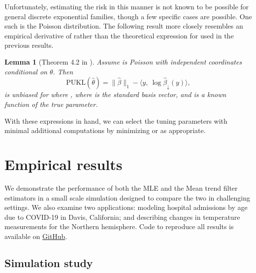 \documentclass[ejs,noshowframe]{imsart}
\theoremstyle{plain}
\newtheorem{lemma}[theorem]{Lemma}
\theoremstyle{definition}
\newcommand{\snorm}[1]{\lVert #1 \rVert}
\newcommand{\E}{E}
\renewcommand{\hat}{\widehat}
\begin{document}
Unfortunately, estimating the risk in this manner is not known to be possible
for general discrete exponential 
families, though a few specific cases are possible. One such is the Poisson distribution. The
following result more closely resembles an empirical derivative of 
\smash{$\hat\beta$}
rather than the theoretical expression for \smash{$J\hat\beta(y)$} used in the 
previous
results. 

\begin{lemma}[Theorem 4.2 in \citealt{Deledalle2017}]
	Assume  is Poisson with independent coordinates conditional on
  $\theta$. Then 
	\begin{equation}
		\mathrm{PUKL}(\hat\theta) = \snorm{\hat\beta}_1 - \langle  y,\
		\log \hat\beta_{\downarrow}(y) \rangle, 
	\end{equation}
	is unbiased for \smash{$\E[\mathrm{KL}(\theta^*\ \Vert\ \hat\theta(Y))] -
    z(\theta^*)$}  
	where
	\smash{$[\hat\beta_{\downarrow}(y)]_i = [\hat\beta(y-e_i)]_i$}, where 
	\smash{$e_i$} 
	is the
	 standard basis vector, and  is a known
	function of the true parameter.
\end{lemma}

With these expressions in hand, we can select the tuning parameters 
\smash{$\lambda_1,\
\lambda_2$} with minimal additional computations by minimizing
\smash{$\mathrm{SUKL}(\hat\theta)$} or 
\smash{$\mathrm{PUKL}(\hat\theta)$} as appropriate.







\section{Empirical results}
\label{sec:experiments}

 We demonstrate the performance of both the MLE and the Mean trend
filter estimators in a small 
scale simulation designed to compare the two in challenging settings. We also
examine two applications: modeling hospital admissions by age due to COVID-19
in Davis, California; and describing changes in temperature measurements for the
Northern hemisphere. Code to reproduce all results is available on \href{https://github.com/dajmcdon/spatio-temporal-exp-fam}{GitHub}.

\subsection{Simulation study}
\end{document}
